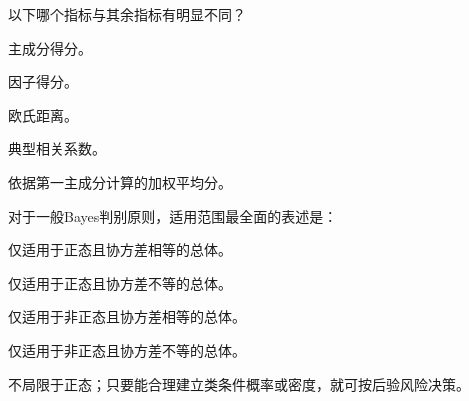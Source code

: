 \par\addvspace{6pt}\noindent\begin{minipage}{\linewidth}


以下哪个指标与其余指标有明显不同？


\begin{choices}

\item 主成分得分。

\item 因子得分。

\item 欧氏距离。

\item 典型相关系数。

\item 依据第一主成分计算的加权平均分。

\end{choices}

\end{minipage}\par\vspace{4pt}

\par\addvspace{6pt}\noindent\begin{minipage}{\linewidth}


对于一般Bayes判别原则，适用范围最全面的表述是：


\begin{choices}

\item 仅适用于正态且协方差相等的总体。

\item 仅适用于正态且协方差不等的总体。

\item 仅适用于非正态且协方差相等的总体。

\item 仅适用于非正态且协方差不等的总体。

\item 不局限于正态；只要能合理建立类条件概率或密度，就可按后验风险决策。

\end{choices}

\end{minipage}\par\vspace{4pt}

